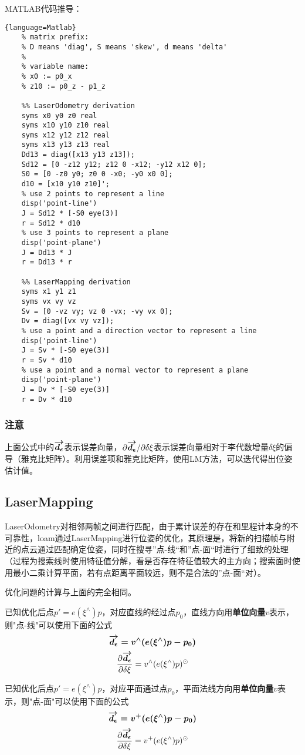 \par MATLAB代码推导：
\small
\begin{lstlisting}{language=Matlab}
	% matrix prefix:
	% D means 'diag', S means 'skew', d means 'delta'
	%
	% variable name:
	% x0 := p0_x
	% z10 := p0_z - p1_z
	
	%% LaserOdometry derivation
	syms x0 y0 z0 real
	syms x10 y10 z10 real
	syms x12 y12 z12 real
	syms x13 y13 z13 real
	Dd13 = diag([x13 y13 z13]);
	Sd12 = [0 -z12 y12; z12 0 -x12; -y12 x12 0];
	S0 = [0 -z0 y0; z0 0 -x0; -y0 x0 0];
	d10 = [x10 y10 z10]';
	% use 2 points to represent a line
	disp('point-line')
	J = Sd12 * [-S0 eye(3)]
	r = Sd12 * d10
	% use 3 points to represent a plane
	disp('point-plane')
	J = Dd13 * J
	r = Dd13 * r
	
	%% LaserMapping derivation
	syms x1 y1 z1
	syms vx vy vz
	Sv = [0 -vz vy; vz 0 -vx; -vy vx 0];
	Dv = diag([vx vy vz]);
	% use a point and a direction vector to represent a line
	disp('point-line')
	J = Sv * [-S0 eye(3)]
	r = Sv * d10
	% use a point and a normal vector to represent a plane
	disp('point-plane')
	J = Dv * [-S0 eye(3)]
	r = Dv * d10
	\end{lstlisting}

\subsubsection{注意}
上面公式中的$\boldmath\overrightarrow{d_\epsilon}\unboldmath$表示误差向量，${\partial \boldmath\overrightarrow{d_{\epsilon}}\unboldmath}/{\partial\delta\xi}$表示误差向量相对于李代数增量$\delta\xi$的偏导（雅克比矩阵）。利用误差项和雅克比矩阵，使用LM方法，可以迭代得出位姿估计值。

\subsection{LaserMapping}
LaserOdometry对相邻两帧之间进行匹配，由于累计误差的存在和里程计本身的不可靠性，loam通过LaserMapping进行位姿的优化，其原理是，将新的扫描帧与附近的点云通过匹配确定位姿，同时在搜寻”点-线“和”点-面“时进行了细致的处理（过程为搜索线时使用特征值分解，看是否存在特征值较大的主方向；搜索面时使用最小二乘计算平面，若有点距离平面较远，则不是合法的”点-面“对）。
\par 优化问题的计算与上面的完全相同。
\par 已知优化后点$p'=e(\xi ^\wedge)p$，对应直线的经过点$p_0$，直线方向用\textbf{单位向量}$v$表示，则"点-线"可以使用下面的公式
\begin{equation}
	\boldmath\overrightarrow{d_{\epsilon}}\unboldmath = v^\wedge(e(\xi ^\wedge)p-p_0)
\end{equation}
\begin{equation}
	\frac{\partial \boldmath\overrightarrow{d_{\epsilon}}\unboldmath}{\partial\delta\xi}
	=
	v^\wedge(e(\xi^\wedge)p)^\odot
\end{equation}
\par 已知优化后点$p'=e(\xi ^\wedge)p$，对应平面通过点$p_0$，平面法线方向用\textbf{单位向量}$v$表示，则"点-面"可以使用下面的公式
\begin{equation}
	\boldmath\overrightarrow{d_{\epsilon}}\unboldmath = v^{+}(e(\xi ^\wedge)p-p_0)
\end{equation}
\begin{equation}
	\frac{\partial \boldmath\overrightarrow{d_{\epsilon}}\unboldmath}{\partial\delta\xi}
	=
	v^{+}(e(\xi^\wedge)p)^\odot
\end{equation}
